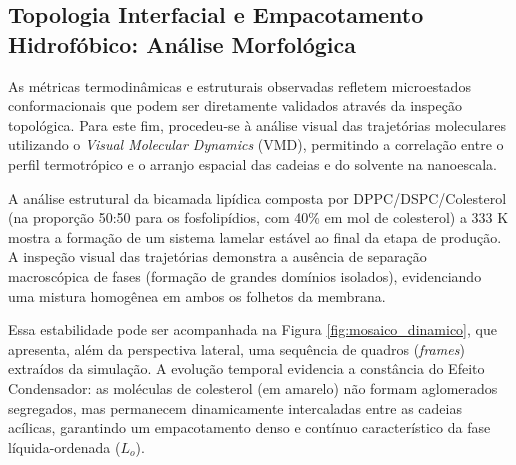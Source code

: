 
\subsection{Topologia Interfacial e Empacotamento Hidrofóbico: Análise Morfológica}

As métricas termodinâmicas e estruturais observadas refletem microestados conformacionais que podem ser diretamente validados através da inspeção topológica. Para este fim, procedeu-se à análise visual das trajetórias moleculares utilizando o \textit{Visual Molecular Dynamics} (VMD), permitindo a correlação entre o perfil termotrópico e o arranjo espacial das cadeias e do solvente na nanoescala.

A análise estrutural da bicamada lipídica composta por DPPC/DSPC/Colesterol (na proporção 50:50 para os fosfolipídios, com 40\% em mol de colesterol) a 333 K mostra a formação de um sistema lamelar estável ao final da etapa de produção. A inspeção visual das trajetórias demonstra a ausência de separação macroscópica de fases (formação de grandes domínios isolados), evidenciando uma mistura homogênea em ambos os folhetos da membrana.

Essa estabilidade pode ser acompanhada na Figura \ref{fig:mosaico_dinamico}, que apresenta, além da perspectiva lateral, uma sequência de quadros (\textit{frames}) extraídos da simulação. A evolução temporal evidencia a constância do Efeito Condensador: as moléculas de colesterol (em amarelo) não formam aglomerados segregados, mas permanecem dinamicamente intercaladas entre as cadeias acílicas, garantindo um empacotamento denso e contínuo característico da fase líquida-ordenada ($L_o$).


